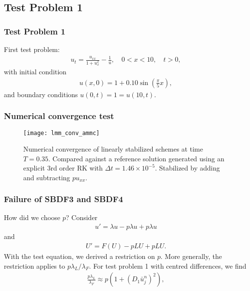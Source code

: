 \documentclass[hyperref={pdfpagelabels=false}]{beamer}
\begin{document}
\subsection{Test Problem 1} 
\begin{frame}
	\frametitle{Test Problem 1} 
First test problem: 
	\begin{align*}
		u_t = \frac{u_{xx}}{1 + u_x^2} - \frac{1}{u}, 
		\quad 0 < x < 10,\quad t > 0, 
	\end{align*}
with initial condition 
	\begin{align*}
		u(x,0) = 1 + 0.10\sin\left(\frac{\pi}{5}x \right),
	\end{align*}
and boundary conditions $u(0,t) = 1 = u(10,t)$.
\end{frame}

\begin{frame}
	\frametitle{Numerical convergence test}
	\begin{figure}[t]
		\centering
		\texttt{[image: lmm\_conv\_ammc]}
		\caption{Numerical convergence of linearly stabilized schemes at time $T=0.35$. Compared against a reference solution generated using an explicit 3rd order RK with $\Delta t = 1.46\times 10^{-5}$. Stabilized by adding and subtracting $pu_{xx}$.}
	\end{figure}
\end{frame}

\begin{frame}
	\frametitle{Failure of SBDF3 and SBDF4}
How did we choose $p$? Consider 
	\begin{align*}
		u' = \lambda u - p\lambda u + p\lambda u
	\end{align*}
and 
	\begin{align*}
		U' = F(U) - pLU + pLU.
	\end{align*}
With the test equation, we derived a restriction on $p$. More generally, the restriction applies to $p\lambda_L / \lambda_F$. For test problem 1 with centred differences, we find 
	\begin{align*}
		\frac{p\lambda_L}{\lambda_F} 
		\approx p(1 + (D_1 \bar u^n_j)^2), 
	\end{align*}
\end{frame}
\end{document}
